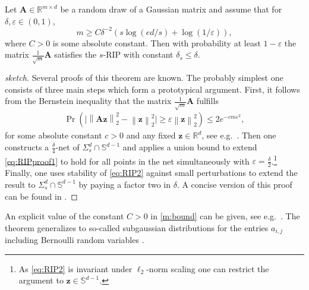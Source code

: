 \documentclass{svproc}
\newcommand{\corr}[1]{#1}
\newcommand{\bA}{\boldsymbol{A}}
\newcommand{\bz}{\boldsymbol{z}}
\newcommand{\0}{\boldsymbol{0}}
\newcommand{\1}{\boldsymbol{1}}
\newcommand{\calN}{\mathcal{N}}
\def\calN{\mathcal{N}}
\def\R{\mathbb{R}}
\newcommand{\pnorm}[2]{\left\| #1 \right\|_{#2}}
\begin{document}
\begin{theorem}%
\label{thm:RIP_Gaussian}
    Let $\bA \in \R^{m\times d}$ be a random draw of a Gaussian matrix and assume that for $\delta, \varepsilon \in (0,1)$,
    \begin{equation}\label{m:bound}
    m \geq C \delta^{-2} \left(s \log(\corr{ed}/s) + \log(1/\varepsilon)\right),
    \end{equation}
    where $C>0$ is some absolute constant. Then with probability at least $1-\varepsilon$ the matrix $\frac{1}{\sqrt{m}} \bA$ satisfies the $s$-RIP with constant $\delta_s \leq \delta$.
%
%    
\end{theorem}

\begin{proof}[sketch] Several proofs of this theorem are known. The \corr{probably} simplest one
    consists of three main steps which form a prototypical argument. 
    First, it follows from the Bernstein inequality that the matrix $\frac{1}{\sqrt{m}} \bA$ fulfills
    \begin{align} \label{eq:RIPproof1}
        \Pr\left( \big| \pnorm{\bA\bz}{2}^2 - \pnorm{\bz}{2}^2 \big| \ge \varepsilon \pnorm{\bz}{2}^2 \right) \le 2e^{-cm\varepsilon^2},
    \end{align}
    for some absolute constant $c > 0$ and any fixed $\bz \in \R^d$, see e.g.\ \cite[Proposition 5.16]{vershynin2010introduction}.
    Then one constructs a $\frac{\delta}{4}$-net of $\Sigma_s^d \cap \mathbb S^{d-1}$ and applies a union bound to extend \eqref{eq:RIPproof1} to hold for all points in the net simultaneously with $\varepsilon = \frac{\delta}{2}$.\footnote{As \eqref{eq:RIP2} is invariant under $\ell_2$-norm scaling one can restrict the argument to $\bz \in \mathbb S^{d-1}$.}
    Finally, one uses stability of \eqref{eq:RIP2} against small perturbations to extend the result to $\Sigma_s^d \cap \mathbb S^{d-1}$ by paying a factor two in $\delta$. A concise version of this proof can be found in \cite{Baraniuk2008,foucart2013mathematical}.
\end{proof}

An explicit value of the constant $C>0$ in \eqref{m:bound} can be given, see e.g.\ \cite[Remark 9.28]{foucart2013mathematical}. The theorem generalizes to so-called subgaussian distributions for the entries $a_{i,j}$ including Bernoulli random variables \cite{mepato09,foucart2013mathematical}.
\end{document}
